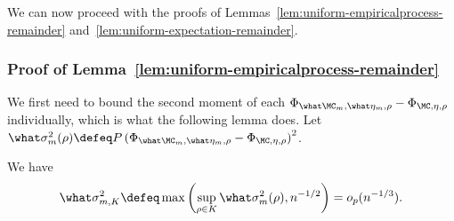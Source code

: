 We can now proceed with the proofs of Lemmas~\ref{lem:uniform-empiricalprocess-remainder} and~\ref{lem:uniform-expectation-remainder}.

\subsubsection{Proof of Lemma~\ref{lem:uniform-empiricalprocess-remainder}}

We first need to bound the second moment of each $\Phi_{\what \MC_m, \what \eta_m, \rho} - \Phi_{\MC,  \eta, \rho}$ individually, which is what the following lemma does.
Let $\what \sigma_m^2(\rho) \defeq  P \left( \Phi_{\what \MC_m, \what \eta_m, \rho} - \Phi_{\MC,  \eta, \rho} \right)^2$. 
\begin{lemma}
\label{lem:uniform-second-moment}
We have
\begin{align*}
\what \sigma_{m,K}^2 \defeq \max\left( \sup_{\rho \in K} \what \sigma^2_m(\rho), n^{-1/2} \right) = o_p(n^{-1/3}).
\end{align*}
\end{lemma}

